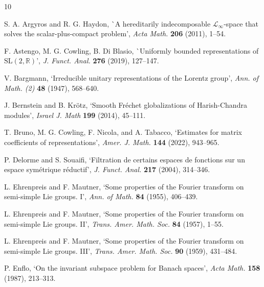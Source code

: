 \documentclass[12pt,a4paper]{amsart}
\theoremstyle{definition}
\theoremstyle{remark}
\numberwithin{equation}{section}
\newcommand{\R}{\mathbb{R}}
\begin{document}
\begin{thebibliography}{10}

\newcommand\auth[1]{{\textrm{#1}}}
\newcommand\papertitle[1]{{\textrm `{#1}'}}
\newcommand\jourtit[1]{{\textit{\frenchspacing#1}}}
\newcommand\journum[1]{{\textbf{#1}}}
\newcommand\booktit[1]{{\textit{#1}}}

S. A. Argyros and R. G. Haydon,
\papertitle{A hereditarily indecomposable $\mathscr{L}_\infty$-space that
solves the scalar-plus-compact problem},
\jourtit{Acta Math.} \journum{206} (2011), 1--54.


F. Astengo, M. G. Cowling,  B. Di Blasio,  
 \papertitle{Uniformly bounded representations of $\mathrm{SL} ( 2 , \R )$}, 
\jourtit{J. Funct. Anal.} \journum{276} (2019), 127--147. 



V. Bargmann, 
`Irreducible unitary representations of the Lorentz group’, 
\textit{Ann. of Math. (2)} \textbf{48} (1947), 568--640.

J. Bernstein and B. Kr\"otz,
`Smooth Fr\'echet globalizations of Harish-Chandra modules',
\textit{Israel J. Math} \textbf{199} (2014),  45--111.

T. Bruno, M. G. Cowling, F. Nicola, and A. Tabacco,
`Estimates for matrix coefficients of representations',
\textit{Amer. J. Math.}
\textbf{144}
(2022),
943--965.
\color{black}

P. Delorme and S. Souaifi,
`Filtration de certains espaces de fonctions sur un espace sym\'etrique r\'eductif',
\textit{J. Funct. Anal.} \textbf{217} (2004), 314--346.



L. Ehrenpreis and F. Mautner, 
`Some properties of the Fourier transform on semi-simple Lie groups. I', 
\textit{Ann. of Math.} \textbf{84} (1955), 406--439.



L. Ehrenpreis and F. Mautner, 
`Some properties of the Fourier transform on semi-simple Lie groups. II', 
\textit{Trans. Amer. Math. Soc.} \textbf{84} (1957), 1--55.

L. Ehrenpreis and F. Mautner, 
`Some properties of the Fourier transform on semi-simple Lie groups. III', 
\textit{Trans. Amer. Math. Soc.} \textbf{90} (1959), 431--484.

 

P. Enflo, 
`On the invariant subspace problem for Banach spaces', 
\textit{Acta Math.} \textbf{158} (1987), 213--313.


\end{thebibliography}
\end{document}
